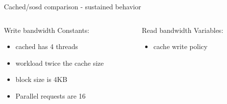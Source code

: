 \begin{frame}{Cached/sosd comparison - sustained behavior}
	\begin{columns}[t]
		\begin{column}{.5\textwidth}
			Write bandwidth
			Constants:
			\begin{itemize}
				\item cached has 4 threads
				\item workload twice the cache size
				\item block size is 4KB
				\item Parallel requests are 16
			\end{itemize}
		\end{column}
		\begin{column}{.5\textwidth}
			Read bandwidth
			Variables:
			\begin{itemize}
				\item cache write policy
			\end{itemize}
		\end{column}
	\end{columns}

\end{frame}

